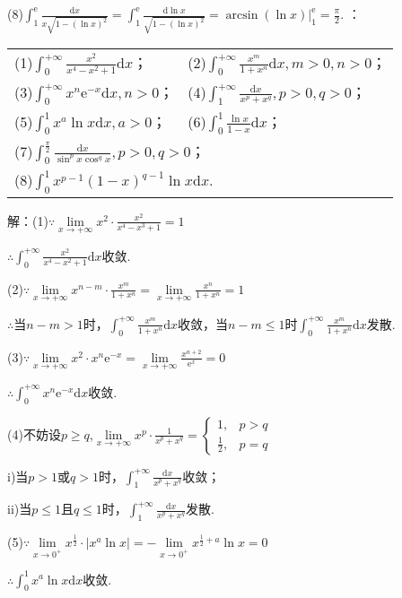 \documentclass[12pt,UTF8]{ctexart}
\begin{document}
\begin{enumerate}
(8)$\int_1^{\mathrm e}\frac{\mathrm dx}{x\sqrt{1-(\ln x)^2}}=\int_1^{\mathrm e}\frac{\mathrm d\ln x}{\sqrt{1-(\ln x)^2}}=\arcsin(\ln x)\Big|_1^{\mathrm e}=\frac\pi2$.
：
\newline
\begin{tabular}{ll}
(1)$\int_0^{+\infty}\frac{x^2}{x^4-x^2+1}\mathrm dx$；&(2)$\int_0^{+\infty}\frac{x^m}{1+x^n}\mathrm dx,m>0,n>0$；\\
(3)$\int_0^{+\infty}x^n\mathrm e^{-x}\mathrm dx,n>0$；&(4)$\int_1^{+\infty}\frac{\mathrm dx}{x^p+x^q},p>0,q>0$；\\
(5)$\int_0^1x^a\ln x\mathrm dx,a>0$；&(6)$\int_0^1\frac{\ln x}{1-x}\mathrm dx$；\\
\multicolumn{2}{l}{(7)$\int_0^{\frac\pi2}\frac{\mathrm dx}{\sin^px\cos^qx},p>0,q>0$；}\\
\multicolumn{2}{l}{(8)$\int_0^1x^{p-1}(1-x)^{q-1}\ln x\mathrm dx$.}
\end{tabular}

解：(1)$\because\lim\limits_{x\rightarrow+\infty}x^2\cdot\frac{x^2}{x^4-x^3+1}=1$

$\therefore\int_0^{+\infty}\frac{x^2}{x^4-x^2+1}\mathrm dx$收敛.

(2)$\because\lim\limits_{x\rightarrow+\infty}x^{n-m}\cdot\frac{x^m}{1+x^n}=\lim\limits_{x\rightarrow+\infty}\frac{x^n}{1+x^n}=1$

$\therefore$当$n-m>1$时，$\int_0^{+\infty}\frac{x^m}{1+x^n}\mathrm dx$收敛，当$n-m\leq1$时$\int_0^{+\infty}\frac{x^m}{1+x^n}\mathrm dx$发散.

(3)$\because\lim\limits_{x\rightarrow+\infty}x^2\cdot x^n\mathrm e^{-x}=\lim\limits_{x\rightarrow+\infty}\frac{x^{n+2}}{\mathrm e^x}=0$

$\therefore\int_0^{+\infty}x^n\mathrm e^{-x}\mathrm dx$收敛.

(4)不妨设$p\geq q$,$\lim\limits_{x\rightarrow+\infty}x^p\cdot\frac1{x^p+x^q}=\begin{cases}
1,&p>q\\
\frac12,&p=q
\end{cases}$

i)当$p>1$或$q>1$时，$\int_1^{+\infty}\frac{\mathrm dx}{x^p+x^q}$收敛；

ii)当$p\leq1$且$q\leq1$时，$\int_1^{+\infty}\frac{\mathrm dx}{x^p+x^q}$发散.

(5)$\because\lim\limits_{x\rightarrow0^+}x^{\frac12}\cdot|x^a\ln x|=-\lim\limits_{x\rightarrow0^+}x^{\frac12+a}\ln x=0$

$\therefore\int_0^1x^a\ln x\mathrm dx$收敛.


\end{enumerate}
\end{document}

